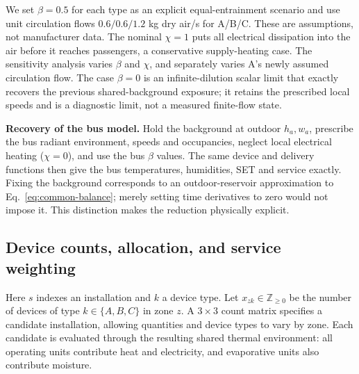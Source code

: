 We set $\beta=0.5$ for each type as an explicit equal-entrainment scenario and use unit circulation flows $0.6/0.6/1.2$ kg dry air/s for A/B/C. These are assumptions, not manufacturer data. The nominal $\chi=1$ puts all electrical dissipation into the air before it reaches passengers, a conservative supply-heating case. The sensitivity analysis varies $\beta$ and $\chi$, and separately varies A's newly assumed circulation flow. The case $\beta=0$ is an infinite-dilution scalar limit that exactly recovers the previous shared-background exposure; it retains the prescribed local speeds and is a diagnostic limit, not a measured finite-flow state.

\noindent\textbf{Recovery of the bus model.} Hold the background at outdoor $h_a,w_a$, prescribe the bus radiant environment, speeds and occupancies, neglect local electrical heating ($\chi=0$), and use the bus $\beta$ values. The same device and delivery functions then give the bus temperatures, humidities, SET and service exactly. Fixing the background corresponds to an outdoor-reservoir approximation to Eq.~\eqref{eq:common-balance}; merely setting time derivatives to zero would not impose it. This distinction makes the reduction physically explicit.

\subsection{Device counts, allocation, and service weighting}

Here $s$ indexes an installation and $k$ a device type. Let $x_{zk}\in\mathbb Z_{\ge0}$ be the number of devices of type $k\in\{A,B,C\}$ in zone $z$. A $3\times3$ count matrix specifies a candidate installation, allowing quantities and device types to vary by zone. Each candidate is evaluated through the resulting shared thermal environment: all operating units contribute heat and electricity, and evaporative units also contribute moisture.

